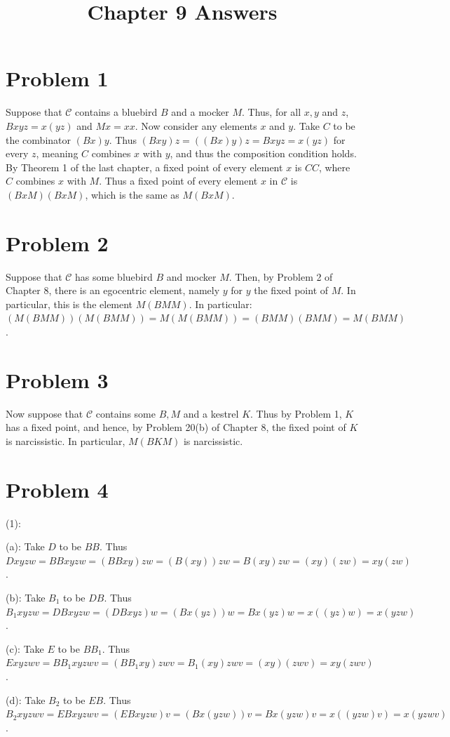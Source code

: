 \documentclass{article}
\title{Chapter 9 Answers}
\theoremstyle{definition}
\begin{document}
\date{}
\maketitle

\section*{Problem 1}
Suppose that $\mathcal{C}$ contains a bluebird $B$ and a mocker $M$. Thus, for all $x,y$ and $z$, $Bxyz=x(yz)$ and $Mx=xx$. Now consider any elements $x$ and $y$. Take $C$ to be the 
combinator $(Bx)y$. Thus $(Bxy)z=((Bx)y)z=Bxyz=x(yz)$ for every $z$, meaning $C$ combines $x$ with $y$, and thus the composition condition holds. By Theorem 1 of the last chapter, 
a fixed point of every element $x$ is $CC$, where $C$ combines $x$ with $M$. Thus a fixed point of every element $x$ in $\mathcal{C}$ is $(BxM)(BxM)$, which is the same as $M(BxM)$.

\section*{Problem 2}
Suppose that $\mathcal{C}$ has some bluebird $B$ and mocker $M$. Then, by Problem 2 of Chapter 8, there is an egocentric element, namely $y$ for $y$ the fixed point of $M$. In particular, 
this is the element $M(BMM)$. In particular: $(M(BMM))(M(BMM))=M(M(BMM))=(BMM)(BMM)=M(BMM)$.

\section*{Problem 3}
Now suppose that $\mathcal{C}$ contains some $B,M$ and a kestrel $K$. Thus by Problem 1, $K$ has a fixed point, and hence, by Problem 20(b) of Chapter 8, the fixed point of $K$ is narcissistic. 
In particular, $M(BKM)$ is narcissistic.

\section*{Problem 4}
(1):


(a): Take $D$ to be $BB$. Thus $Dxyzw=BBxyzw=(BBxy)zw=(B(xy))zw=B(xy)zw=(xy)(zw)=xy(zw)$.


(b): Take $B_1$ to be $DB$. Thus $B_1xyzw=DBxyzw=(DBxyz)w=(Bx(yz))w=Bx(yz)w=x((yz)w)=x(yzw)$.


(c): Take $E$ to be $BB_1$. Thus $Exyzwv=BB_1xyzwv=(BB_1xy)zwv=B_1(xy)zwv=(xy)(zwv)=xy(zwv)$.


(d): Take $B_2$ to be $EB$. Thus $B_2xyzwv=EBxyzwv=(EBxyzw)v=(Bx(yzw))v=Bx(yzw)v=x((yzw)v)=x(yzwv)$.
\end{document}
